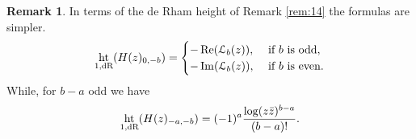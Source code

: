 \documentclass[11pt,a4paper]{amsart}
\newcommand{\dR}{\text{\rm dR}}
\newcommand{\caL}{\mathcal{L}}
\DeclareMathOperator{\im}{Im}
\DeclareMathOperator{\re}{Re}
\DeclareMathOperator{\Ht}{ht}
\numberwithin{equation}{section}
\theoremstyle{plain}
\theoremstyle{definition}
\newtheorem{rmk}[prop]{Remark}
\begin{document}
  \begin{rmk}
    In terms of the de Rham height of Remark \ref{rem:14} the formulas
    are simpler.
    \begin{displaymath}
      \Ht_{1,\dR}(H(z)_{0,-b})=
      \begin{cases}
        -\re(\caL_{b}(z)),&\text{ if $b$ is odd},\\
        -\im(\caL_{b}(z)),&\text{ if $b$ is even}.
      \end{cases}
    \end{displaymath}
    While, for $b-a$ odd we have
    \begin{displaymath}
      \Ht_{1,\dR}(H(z)_{-a,-b})= (-1)^{a}\frac{\log(z\bar z)^{b-a}}{(b-a)!}.
    \end{displaymath}
 \end{rmk}
  
\end{document}
